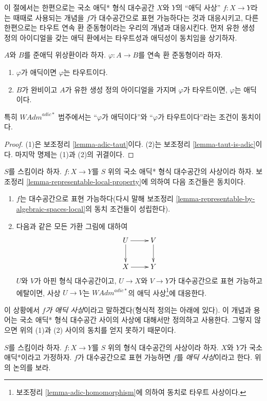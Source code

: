 \noindent
이 절에서는 한편으로는 국소 애딕* 형식 대수공간 $X$와 $Y$의
``애딕 사상'' $f : X \to Y$라는 때때로 사용되는 개념을 $f$가
대수공간으로 표현 가능하다는 것과 대응시키고, 다른 한편으로는
타우트 연속 환 준동형이라는 우리의 개념과 대응시킨다. 먼저 유한
생성 정의 아이디얼을 갖는 애딕 환에서는 타우트성과 애딕성이
동치임을 상기하자.

\begin{lemma}
\label{lemma-adic-homomorphism}
$A$와 $B$를 준애딕 위상환이라 하자.
$\varphi : A \to B$를 연속 환 준동형이라 하자.
\begin{enumerate}
\item $\varphi$가 애딕이면 $\varphi$는 타우트이다.
\item $B$가 완비이고 $A$가 유한 생성 정의 아이디얼을 가지며
$\varphi$가 타우트이면, $\varphi$는 애딕이다.
\end{enumerate}
특히 $\textit{WAdm}^{adic*}$ 범주에서는 ``$\varphi$가 애딕이다''와
``$\varphi$가 타우트이다''라는 조건이 동치이다.
\end{lemma}

\begin{proof}
(1)은 보조정리 \ref{lemma-adic-taut}이다.
(2)는 보조정리 \ref{lemma-taut-is-adic}이다.
마지막 명제는 (1)과 (2)의 귀결이다.
\end{proof}

\noindent
$S$를 스킴이라 하자. $f : X \to Y$를 $S$ 위의 국소 애딕* 형식
대수공간의 사상이라 하자. 보조정리
\ref{lemma-representable-local-property}에 의하여 다음 조건들은
동치이다.
\begin{enumerate}
\item $f$는 대수공간으로 표현 가능하다(다시 말해 보조정리
\ref{lemma-representable-by-algebraic-spaces-local}의 동치 조건들이
성립한다).
\item 다음과 같은 모든 가환 그림에 대하여
$$
\xymatrix{
U \ar[d] \ar[r] & V \ar[d] \\
X \ar[r] & Y
}
$$
$U$와 $V$가 아핀 형식 대수공간이고, $U \to X$와 $V \to Y$가
대수공간으로 표현 가능하고 에탈이면, 사상 $U \to V$는
$\textit{WAdm}^{adic*}$의 애딕 사상\footnote{보조정리
\ref{lemma-adic-homomorphism}에 의하여 동치로 타우트 사상이다.}에
대응한다.
\end{enumerate}
이 상황에서 {\it $f$가 애딕 사상}이라고 말하겠다(형식적 정의는
아래에 있다). 이 개념과 용어는 국소 애딕* 형식 대수공간 사이의
사상에 대해서만 정의하고 사용한다. 그렇지 않으면 위의 (1)과 (2)
사이의 동치를 얻지 못하기 때문이다.

\begin{definition}
\label{definition-adic-morphism}
$S$를 스킴이라 하자. $f : X \to Y$를 $S$ 위의 형식 대수공간의
사상이라 하자. $X$와 $Y$가 국소 애딕*이라고 가정하자. $f$가
대수공간으로 표현 가능하면 $f$를 {\it 애딕 사상}이라고 한다.
위의 논의를 보라.
\end{definition}

